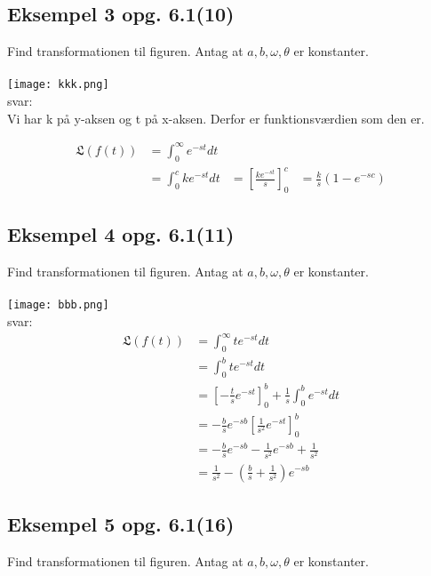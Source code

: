 \documentclass[11pt,fleqn]{book} %
\begin{document}
\subsection{Eksempel 3 opg. 6.1(10)}
Find transformationen til figuren. Antag at $a, b, \omega, \theta$ er konstanter.\\\\

\texttt{[image: kkk.png]}\\
svar:\\
Vi har k på y-aksen og t på x-aksen. Derfor er funktionsværdien som den er.

\begin{equation}
\begin{split}
\mathfrak{L}(f(t)) & =\int_{0}^{\infty}e^{-st}dt\\
& = \int_{0}^{c}ke^{-st}dt
& = [\frac{ke^{-st}}{s}]^c_0 
& = \frac{k}{s}(1-e^{-sc})
\end{split}
\end{equation}



\subsection{Eksempel 4 opg. 6.1(11)} \label{juksi}
Find transformationen til figuren. Antag at $a, b, \omega, \theta$ er konstanter.\\\\

\texttt{[image: bbb.png]}\\
svar:\\
\begin{equation}
\begin{split}
\mathfrak{L}(f(t)) &= \int_{0}^{\infty}te^{-st}dt\\
& =\int_{0}^{b}te^{-st}dt\\
& = [-\frac{t}{s}e^{-st}]^b_0+\frac{1}{s}\int_{0}^{b}e^{-st}dt\\
& = -\frac{b}{s}e^{-sb}[\frac{1}{s^2}e^{-st}]^b_0\\
& = - \frac{b}{s}e^{-sb}- \frac{1}{s^2}e^{-sb}+ \frac{1}{s^2}\\
& = \frac{1}{s^2}-(\frac{b}{s}+\frac{1}{s^2})e^{-sb}
\end{split}
\end{equation}

\subsection{Eksempel 5 opg. 6.1(16)}
Find transformationen til figuren. Antag at $a, b, \omega, \theta$ er konstanter.\\\\
\end{document}

